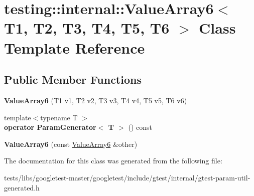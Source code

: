 \hypertarget{classtesting_1_1internal_1_1ValueArray6}{}\section{testing\+:\+:internal\+:\+:Value\+Array6$<$ T1, T2, T3, T4, T5, T6 $>$ Class Template Reference}
\label{classtesting_1_1internal_1_1ValueArray6}
\subsection*{Public Member Functions}
\begin{DoxyCompactItemize}
\item 
\mbox{\label{classtesting_1_1internal_1_1ValueArray6_ad1c323929591d89807220281ceb6d4d5}} 
{\bfseries Value\+Array6} (T1 v1, T2 v2, T3 v3, T4 v4, T5 v5, T6 v6)
\item 
\mbox{\label{classtesting_1_1internal_1_1ValueArray6_ab6cb557146bca7cf5fcfa40f10dee9da}} 
{\footnotesize template$<$typename T $>$ }\\{\bfseries operator Param\+Generator$<$ T $>$} () const
\item 
\mbox{\label{classtesting_1_1internal_1_1ValueArray6_a270702109b4185c6749310902fed7456}} 
{\bfseries Value\+Array6} (const \hyperlink{classtesting_1_1internal_1_1ValueArray6}{Value\+Array6} \&other)
\end{DoxyCompactItemize}


The documentation for this class was generated from the following file\+:\begin{DoxyCompactItemize}
\item 
tests/libs/googletest-\/master/googletest/include/gtest/internal/gtest-\/param-\/util-\/generated.\+h\end{DoxyCompactItemize}
